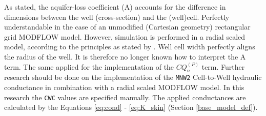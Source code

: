 As stated, the aquifer-loss coefficient (A) accounts for the difference in dimensions between the well (cross-section) and the (well)cell. Perfectly understandable in the case of an unmodified (Cartesian geometry) rectangular grid MODFLOW model. However, simulation is performed in a radial scaled model, according to the principles as stated by \citet{Langevin2008}. Well cell width perfectly aligns the radius of the well. It is therefore no longer known how to interpret the A term. The same applied for the implementation of the $CQ_{n}^{(P)}$ term. Further research should be done on the implementation of the \texttt{MNW2} Cell-to-Well hydraulic conductance in combination with a radial scaled MODFLOW model. In this research the \texttt{CWC} values are specified manually. The applied conductances are calculated by the Equations \ref{eq:cond} - \ref{eq:K_skin} (Section \ref{base_model_def}).  \\
%

%
%
%


